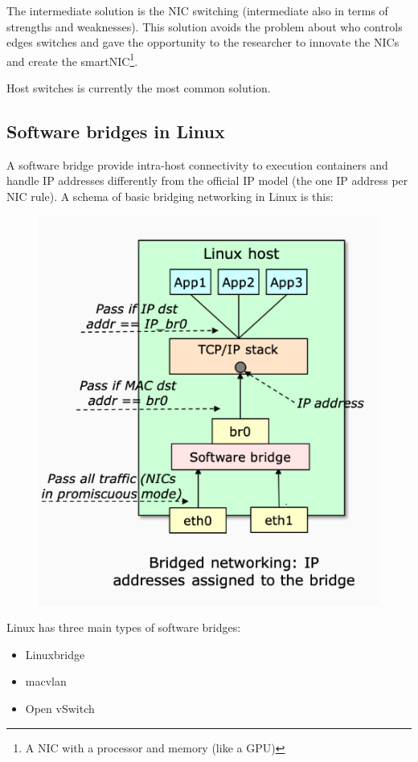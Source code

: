     The intermediate solution is the NIC switching (intermediate also in terms of strengths and weaknesses). This solution avoids the problem about who controls edges switches and gave the opportunity to the researcher to innovate the NICs and create the smartNIC\footnote{A NIC with a processor and memory (like a GPU)}.
    
    Host switches is currently the most common solution.
    
    \subsection{Software bridges in Linux}
    A software bridge provide intra-host connectivity to execution containers and handle IP addresses differently from the official IP model (the one IP address per NIC rule). A schema of basic bridging networking in Linux is this:
    \begin{figure}[h!]
        \centering
        \includegraphics[scale=0.25]{images/bridgeschema.png}
    \end{figure}
    Linux has three main types of software bridges:
    \begin{itemize}
        \item Linuxbridge
        \item macvlan
        \item Open vSwitch
    \end{itemize}
